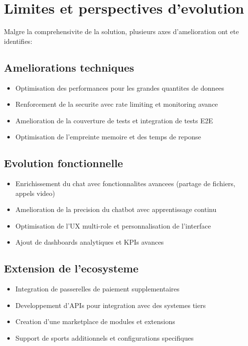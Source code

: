 \section{Limites et perspectives d'evolution}

Malgre la comprehensivite de la solution, plusieurs axes d'amelioration ont ete identifies:

\subsection*{Ameliorations techniques}
\begin{itemize}
  \item Optimisation des performances pour les grandes quantites de donnees
  \item Renforcement de la securite avec rate limiting et monitoring avance
  \item Amelioration de la couverture de tests et integration de tests E2E
  \item Optimisation de l'empreinte memoire et des temps de reponse
\end{itemize}

\subsection*{Evolution fonctionnelle}
\begin{itemize}
  \item Enrichissement du chat avec fonctionnalites avancees (partage de fichiers, appels video)
  \item Amelioration de la precision du chatbot avec apprentissage continu
  \item Optimisation de l'UX multi-role et personnalisation de l'interface
  \item Ajout de dashboards analytiques et KPIs avances
\end{itemize}

\subsection*{Extension de l'ecosysteme}
\begin{itemize}
  \item Integration de passerelles de paiement supplementaires
  \item Developpement d'APIs pour integration avec des systemes tiers
  \item Creation d'une marketplace de modules et extensions
  \item Support de sports additionnels et configurations specifiques
\end{itemize}

